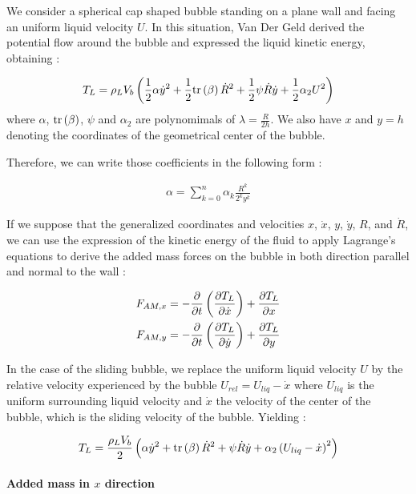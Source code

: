 We consider a spherical cap shaped bubble standing on a plane wall and facing an uniform liquid velocity $U$. In this situation, Van Der Geld derived the potential flow around the bubble and expressed the liquid kinetic energy, obtaining : 

\begin{align}
T_{L}=\rho_{L}V_{b}\left(  \frac{1}{2}\alpha \dot{y}^{2} + \frac{1}{2} \mathrm{tr}\left( \beta \right)\dot{R}^{2}+\frac{1}{2}\psi \dot{R}\dot{y} + \frac{1}{2} \alpha_{2} U^{2}  \right)
\end{align}
where $\alpha$, $\mathrm{tr}\left( \beta \right)$, $\psi$ and $\alpha_{2}$ are polynomimals of $\lambda = \frac{R}{2h}$. We also have $x$ and $y=h$ denoting the coordinates of the geometrical center of the bubble.

Therefore, we can write those coefficients in the following form : 

\begin{align}
\alpha = \sum_{k=0}^{n}\alpha_{k}\frac{R^{k}}{2^{k}y^{k}}
\end{align}

If we suppose that the generalized coordinates and velocities $x$, $\dot{x}$, $y$, $\dot{y}$, $R$, and $\dot{R}$, we can use the expression of the kinetic energy of the fluid to apply Lagrange's equations to derive the added mass forces on the bubble in both direction parallel and normal to the wall :

\begin{align}
F_{AM,x}&=-\frac{\partial }{\partial t}\left( \frac{\partial T_{L}}{\partial \dot{x}} \right)+\frac{\partial T_{L}}{\partial x}\\
F_{AM,y}&=-\frac{\partial }{\partial t}\left( \frac{\partial T_{L}}{\partial \dot{y}} \right)+\frac{\partial T_{L}}{\partial y}
\end{align}

In the case of the sliding bubble, we replace the uniform liquid velocity $U$ by the relative velocity experienced by the bubble $U_{rel}=U_{liq}-\dot{x}$ where $U_{liq}$ is the uniform surrounding liquid velocity and $\dot{x}$ the velocity of the center of the bubble, which is the sliding velocity of the bubble. Yielding :



\begin{align}
T_{L}=\frac{\rho_{L}V_{b}}{2}\left( \alpha \dot{y}^{2} +\mathrm{tr}\left( \beta \right)\dot{R}^{2}+\psi \dot{R}\dot{y} +\alpha_{2} \left( U_{liq}-\dot{x} \right)^{2}  \right)
\end{align}
 

\paragraph{Added mass in $x$ direction}

